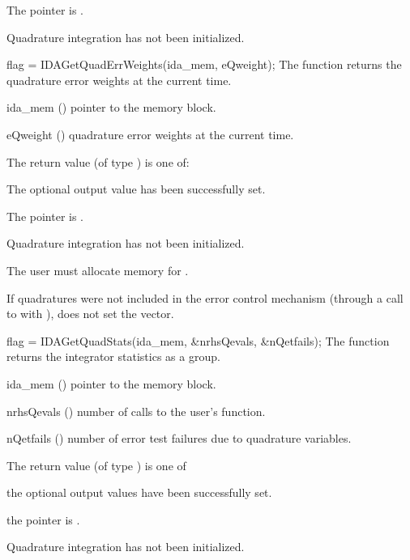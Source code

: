 {{\begin{args}
  \item[\Id{IDA\_MEM\_NULL}]
    The  pointer is .
  \item[\Id{IDA\_NO\_QUAD}]
    Quadrature integration has not been initialized.
  \end{args}
}
{}
{
  flag = IDAGetQuadErrWeights(ida\_mem, eQweight);
}
{
  The function  returns the quadrature error weights 
  at the current time.
}
{
  \begin{args}
  \item[ida\_mem] ()
    pointer to the {\idas} memory block.
  \item[eQweight] ()
    quadrature error weights at the current time.
  \end{args}
}
{
  The return value  (of type ) is one of:
  \begin{args}
  \item[\Id{IDA\_SUCCESS}] 
    The optional output value has been successfully set.
  \item[\Id{IDA\_MEM\_NULL}]
    The  pointer is .
  \item[\Id{IDA\_NO\_QUAD}]
    Quadrature integration has not been initialized.
  \end{args}
}
{
  {\warn}The user must allocate memory for .

  If quadratures were not included in the error control mechanism (through a 
  call to  with ), 
   does not set the  vector.
}
{
  flag = IDAGetQuadStats(ida\_mem, \&nrhsQevals, \&nQetfails);
}
{
  The function  returns the {\idas} integrator statistics
  as a group.
}
{
  \begin{args}
  \item[ida\_mem] ()
    pointer to the {\idas} memory block.
  \item[nrhsQevals] ()
    number of calls to the user's  function.
  \item[nQetfails] ()
    number of error test failures due to quadrature variables.
  \end{args}
}
{
  The return value  (of type ) is one of
  \begin{args}
  \item[\Id{IDA\_SUCCESS}] 
    the optional output values have been successfully set.
  \item[\Id{IDA\_MEM\_NULL}]
    the  pointer is .
  \item[\Id{IDA\_NO\_QUAD}]
    Quadrature integration has not been initialized.
  \end{args}
}
{}

}
